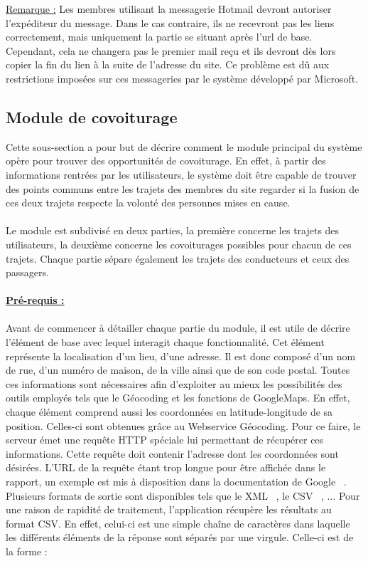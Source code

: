 \documentclass[12pt, a4paper, oneside]{article}
\begin{document}
     \underline{Remarque :} Les membres utilisant la messagerie Hotmail devront autoriser l'expéditeur du message. Dans le cas contraire, ils ne recevront pas les liens correctement, mais uniquement la partie se situant après l'url de base. Cependant, cela ne changera pas le premier mail reçu et ils devront dès lors copier la fin du lien à la suite de l'adresse du site. Ce problème est dû aux restrictions imposées sur ces messageries par le système développé par Microsoft.\\
     
\subsection{Module de covoiturage} \label{covoiturage}
    Cette sous-section a pour but de décrire comment le module principal du système opère pour trouver des opportunités de covoiturage. En effet, à partir des informations rentrées par les utilisateurs, le système doit être capable de trouver des points communs entre les trajets des membres du site regarder si la fusion de ces deux trajets respecte la volonté des personnes mises en cause.\\\\
    \indent Le module est subdivisé en deux parties, la première concerne les trajets des utilisateurs, la deuxième concerne les covoiturages possibles pour chacun de ces trajets. Chaque partie sépare également les trajets des conducteurs et ceux des passagers.\\\\
    \underline{\textbf{Pré-requis :}}\\\\
    \indent Avant de commencer à détailler chaque partie du module, il est utile de décrire l'élément de base avec lequel interagit chaque fonctionnalité. Cet élément représente la localisation d'un lieu, d'une adresse. Il est donc composé d'un nom de rue, d'un numéro de maison, de la ville ainsi que de son code postal. Toutes ces informations sont nécessaires afin d'exploiter au mieux les possibilités des outils employés tels que le Géocoding et les fonctions de GoogleMaps. En effet, chaque élément comprend aussi les coordonnées en latitude-longitude de sa position. Celles-ci sont obtenues grâce au Webservice Géocoding. Pour ce faire, le serveur émet une requête HTTP spéciale lui permettant de récupérer ces informations. Cette requête doit contenir l'adresse dont les coordonnées sont désirées. L'URL de la requête étant trop longue pour être affichée dans le rapport, un exemple est mis à disposition dans la documentation de Google ~\cite{google-geodoc}. Plusieurs formats de sortie sont disponibles tels que le XML ~\cite{XML}, le CSV ~\cite{CSV}, ... Pour une raison de rapidité de traitement, l'application récupère les résultats au format CSV. En effet, celui-ci est une simple chaîne de caractères dans laquelle les différents éléments de la réponse sont séparés par une virgule. Celle-ci est de la forme :
\end{document}
